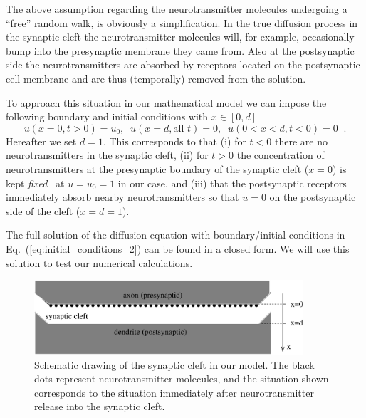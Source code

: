 \documentclass{article}
\begin{document}
The above assumption regarding the
neurotransmitter molecules undergoing a ``free'' random walk, is
obviously a simplification. In the true diffusion process in the
synaptic cleft the neurotransmitter molecules will, for example,
occasionally bump into the presynaptic membrane they came from. Also
at the postsynaptic side the neurotransmitters are absorbed by
receptors located on the postsynaptic cell membrane and are thus
(temporally) removed from the solution.

To approach this situation in our mathematical model we can impose the
following boundary and initial conditions with $x\in[0,d]$
%
\begin{equation}
u(x=0,t>0) = u_0, \;\;u(x=d,\mbox{all $t$})=0,
\;\;u(0 < x < d,t < 0) = 0 \;\;.
\label{eq:initial_conditions_2}
\end{equation}
Hereafter we set $d=1$.
This corresponds to that (i) for $t<0$ there are no neurotransmitters
in the synaptic cleft, (ii) for $t>0$ the concentration of
neurotransmitters at the presynaptic boundary of the synaptic
cleft ($x=0$) is kept
\emph{fixed}  at $u=u_0=1$ in our case, and (iii) that the postsynaptic receptors
immediately absorb nearby neurotransmitters so that $u=0$ on the
postsynaptic side of the cleft ($x=d=1$).


The full solution of the diffusion equation with
boundary/initial conditions in Eq.~(\ref{eq:initial_conditions_2})
can be found in a closed form. We will use this solution to test our numerical calculations.
%
%
\begin{figure}[b]
\centerline{\includegraphics[width=10cm]{synaptic_cleft.eps}}
\caption{\small Schematic drawing of the synaptic cleft in our model. The
black dots represent neurotransmitter molecules, and the situation
shown corresponds to the situation immediately after neurotransmitter
release into the synaptic cleft.}
\label{fig:figure3}
\end{figure}
%
%
\end{document}
